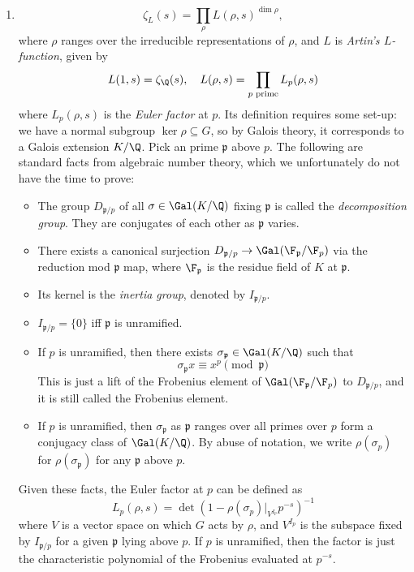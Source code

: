 \documentclass[a4paper]{article}
\begin{document}
\begin{enumerate}
  \item
    \[
      \zeta_L(s) = \prod_{\rho} L(\rho, s)^{\dim \rho},
    \]
    where $\rho$ ranges over the irreducible representations of $\rho$, and $L$ is \emph{Artin's $L$-function}, given by
 \[
 L(1, s) = \zeta_\Q(s),\quad L(\rho, s) = \prod_{p\text{ prime}}L_p(\rho,s)
 \]
 where $L_p(\rho,s)$ is the \emph{Euler factor} at $p$. Its definition requires some set-up: we have a normal subgroup $\ker\rho\subseteq G$, so by Galois theory, it corresponds to a Galois extension $K/\Q$. Pick an prime $\mathfrak{p}$ above $p$. The following are standard facts from algebraic number theory, which we unfortunately do not have the time to prove:
 \begin{itemize}
   \item The group $D_{\mathfrak{p}/p}$ of all $\sigma\in\Gal(K/\Q)$ fixing $\mathfrak{p}$ is called the \emph{decomposition group}. They are conjugates of each other as $\mathfrak{p}$ varies.
   \item There exists a canonical surjection $D_{\mathfrak{p}/p}\to\Gal(\F_\mathfrak{p}/\F_p)$ via the reduction mod $\mathfrak{p}$ map, where $\F_\mathfrak{p}$ is the residue field of $K$ at $\mathfrak{p}$.
   \item Its kernel is the \emph{inertia group}, denoted by $I_{\mathfrak{p}/p}$.   
   \item $I_{\mathfrak{p}/p}=\{0\}$ iff $\mathfrak{p}$ is unramified.
   \item If $p$ is unramified, then there exists $\sigma_{\mathfrak{p}}\in\Gal(K/\Q)$ such that
   \[
     \sigma_{\mathfrak{p}}x\equiv x^p\pmod{\mathfrak{p}}
   \]
   This is just a lift of the Frobenius element of $\Gal(\F_\mathfrak{p}/\F_p)$ to $D_{\mathfrak{p}/p}$, and it is still called the Frobenius element.
   \item If $p$ is unramified, then $\sigma_{\mathfrak{p}}$ as $\mathfrak{p}$ ranges over all primes over $p$ form a conjugacy class of $\Gal(K/\Q)$. By abuse of notation, we write $\rho(\sigma_p)$ for $\rho(\sigma_\mathfrak{p})$ for any $\mathfrak{p}$ above $p$.
 \end{itemize}
 Given these facts, the Euler factor at $p$ can be defined as
 \[
   L_p(\rho,s)=\det(1-\rho(\sigma_p)|_{V^{I_p}}p^{-s})^{-1}
 \]
 where $V$ is a vector space on which $G$ acts by $\rho$, and $V^{I_p}$ is the subspace fixed by $I_{\mathfrak{p}/p}$ for a given $\mathfrak{p}$ lying above $p$. If $p$ is unramified, then the factor is just the characteristic polynomial of the Frobenius evaluated at $p^{-s}$.
 

\end{enumerate}
\end{document}
